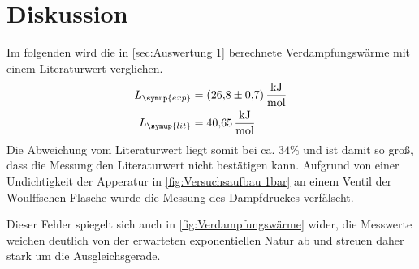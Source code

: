 \section{Diskussion}
\label{sec:Diskussion}

Im folgenden wird die in \autoref{sec:Auswertung 1} berechnete Verdampfungswärme mit einem Literaturwert \cite{czichos} verglichen.
\begin{align}
    L_{\symup{exp}}&=\qty{26,8+-0,7}{\kilo\joule\per\mol} \notag \\ 
    L_{\symup{lit}}&=\qty{40,65}{\kilo\joule\per\mol} \notag
\end{align}
Die Abweichung vom Literaturwert liegt somit bei ca. $34\%$ und ist damit so groß, dass die Messung den
Literaturwert nicht bestätigen kann.
Aufgrund von einer Undichtigkeit der Apperatur in \autoref{fig:Versuchsaufbau 1bar} an einem Ventil
der Woulffschen Flasche wurde die Messung des Dampfdruckes verfälscht.

Dieser Fehler spiegelt sich auch in \autoref{fig:Verdampfungswärme} wider, die Messwerte weichen deutlich
von der erwarteten exponentiellen Natur ab und streuen daher stark um die Ausgleichsgerade.